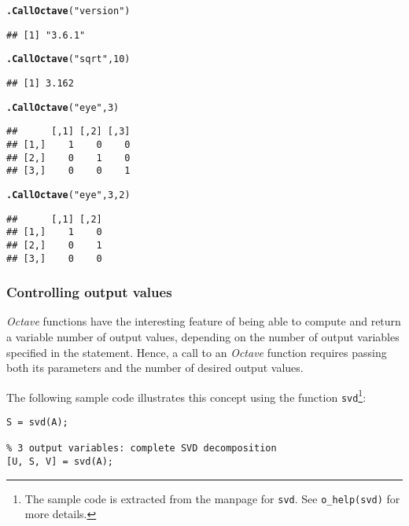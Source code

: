 \documentclass[english,10pt,a4paper]{article}\usepackage{graphicx, color}
\makeatletter
\newcommand{\hlfunctioncall}[1]{\textcolor[rgb]{0.501960784313725,0,0.329411764705882}{\textbf{#1}}}%
\newcommand{\hlstring}[1]{\textcolor[rgb]{0.6,0.6,1}{#1}}%
\newenvironment{kframe}{%
 \def\at@end@of@kframe{}%
 \ifinner\ifhmode%
  \def\at@end@of@kframe{\end{minipage}}%
  \begin{minipage}{\columnwidth}%
 \fi\fi%
 \def\FrameCommand##1{\hskip\@totalleftmargin \hskip-\fboxsep
 \colorbox{shadecolor}{##1}\hskip-\fboxsep
     \hskip-\linewidth \hskip-\@totalleftmargin \hskip\columnwidth}%
 \MakeFramed {\advance\hsize-\width
   \@totalleftmargin\z@ \linewidth\hsize
   \@setminipage}}%
 {\par\unskip\endMakeFramed%
 \at@end@of@kframe}
\newenvironment{knitrout}{}{} %
\let\proglang=\textit
\let\code=\texttt
\newcommand{\octave}{\proglang{Octave}\xspace}
\makeatother
\begin{document}
\begin{knitrout}
\color{fgcolor}\begin{kframe}
\begin{alltt}
\hlfunctioncall{.CallOctave}(\hlstring{"version"})
\end{alltt}
\begin{verbatim}
## [1] "3.6.1"
\end{verbatim}
\begin{alltt}
\hlfunctioncall{.CallOctave}(\hlstring{"sqrt"}, 10)
\end{alltt}
\begin{verbatim}
## [1] 3.162
\end{verbatim}
\begin{alltt}
\hlfunctioncall{.CallOctave}(\hlstring{"eye"}, 3)
\end{alltt}
\begin{verbatim}
##      [,1] [,2] [,3]
## [1,]    1    0    0
## [2,]    0    1    0
## [3,]    0    0    1
\end{verbatim}
\begin{alltt}
\hlfunctioncall{.CallOctave}(\hlstring{"eye"}, 3, 2)
\end{alltt}
\begin{verbatim}
##      [,1] [,2]
## [1,]    1    0
## [2,]    0    1
## [3,]    0    0
\end{verbatim}
\end{kframe}
\end{knitrout}


\subsubsection{Controlling output values}
\label{sec:argout}

\octave functions have the interesting feature of being able to compute
and return a variable number of output values, depending on the number of output
variables specified in the statement.
Hence, a call to an \octave function requires passing both its parameters and
the number of desired output values.

The following sample code illustrates this concept using the function
\code{svd}\footnote{The sample code is extracted from the manpage for
\code{svd}. See \code{o\_help(svd)} for more details.}:

\begin{Verbatim}[frame=single]
% single output variable: eigen values only
S = svd(A);

% 3 output variables: complete SVD decomposition  
[U, S, V] = svd(A);
\end{Verbatim}
\end{document}

